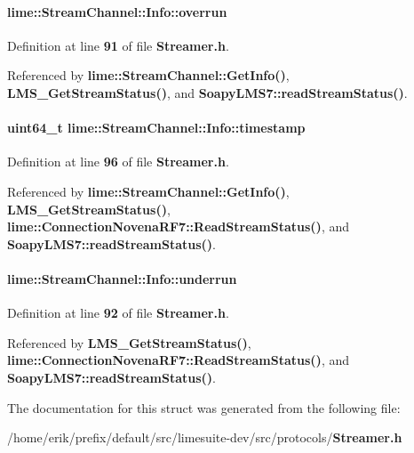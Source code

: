 \paragraph[{overrun}]{ lime\+::\+Stream\+Channel\+::\+Info\+::overrun}\label{structlime_1_1StreamChannel_1_1Info_a8433b7cc7cb1d654d747401aa7b5fee8}


Definition at line {\bf 91} of file {\bf Streamer.\+h}.



Referenced by {\bf lime\+::\+Stream\+Channel\+::\+Get\+Info()}, {\bf L\+M\+S\+\_\+\+Get\+Stream\+Status()}, and {\bf Soapy\+L\+M\+S7\+::read\+Stream\+Status()}.

\paragraph[{timestamp}]{\setlength{\rightskip}{0pt plus 5cm}uint64\+\_\+t lime\+::\+Stream\+Channel\+::\+Info\+::timestamp}\label{structlime_1_1StreamChannel_1_1Info_a1c44b39790bb37174640c0fac3be7fd9}


Definition at line {\bf 96} of file {\bf Streamer.\+h}.



Referenced by {\bf lime\+::\+Stream\+Channel\+::\+Get\+Info()}, {\bf L\+M\+S\+\_\+\+Get\+Stream\+Status()}, {\bf lime\+::\+Connection\+Novena\+R\+F7\+::\+Read\+Stream\+Status()}, and {\bf Soapy\+L\+M\+S7\+::read\+Stream\+Status()}.

\paragraph[{underrun}]{ lime\+::\+Stream\+Channel\+::\+Info\+::underrun}\label{structlime_1_1StreamChannel_1_1Info_a8e4e28d1755358f0ee89cba292598ce0}


Definition at line {\bf 92} of file {\bf Streamer.\+h}.



Referenced by {\bf L\+M\+S\+\_\+\+Get\+Stream\+Status()}, {\bf lime\+::\+Connection\+Novena\+R\+F7\+::\+Read\+Stream\+Status()}, and {\bf Soapy\+L\+M\+S7\+::read\+Stream\+Status()}.



The documentation for this struct was generated from the following file\+:\begin{DoxyCompactItemize}
\item 
/home/erik/prefix/default/src/limesuite-\/dev/src/protocols/{\bf Streamer.\+h}\end{DoxyCompactItemize}
